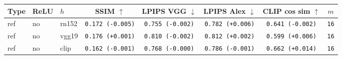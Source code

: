 \begin{tabular}{|l|l|l|c|c|c|c|c|}
\hline
Type & ReLU & $h$ & SSIM $\uparrow$ & LPIPS VGG $\downarrow$ & LPIPS Alex $\downarrow$ & CLIP cos sim $\uparrow$ & $m$ \\
\hline
ref & no & rn152 & \texttt{0.172 {\color{red}(-0.005)}} & \texttt{0.755 {\color{green}(-0.002)}} & \texttt{0.782 {\color{red}(+0.006)}} & \texttt{0.641 {\color{red}(-0.002)}} & \texttt{16} \\
\hline
ref & no & vgg19 & \texttt{0.176 {\color{green}(+0.001)}} & \texttt{0.810 {\color{green}(-0.002)}} & \texttt{0.812 {\color{red}(+0.002)}} & \texttt{0.599 {\color{green}(+0.006)}} & \texttt{16} \\
\hline
ref & no & clip & \texttt{0.162 {\color{red}(-0.001)}} & \texttt{0.768 {\color{black}(-0.000)}} & \texttt{0.786 {\color{green}(-0.001)}} & \texttt{0.662 {\color{green}(+0.014)}} & \texttt{16} \\
\hline
\end{tabular}
